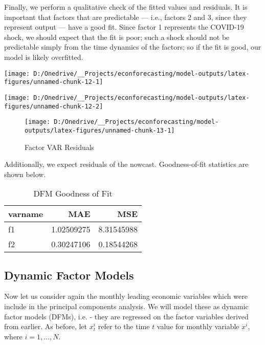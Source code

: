 \documentclass[11pt, letterpaper]{article}\usepackage[]{graphicx}\usepackage[]{color}
\begin{document}
Finally, we perform a qualitative check of the fitted values and residuals. It is important that factors that are predictable --- i.e., factors 2 and 3, since they represent output --- have a good fit. Since factor 1 represents the COVID-19 shock, we should expect that the fit is poor; such a shock should not be predictable simply from the time dynamics of the factors; so if the fit is good, our model is likely overfitted.


{\centering \texttt{[image: D:/Onedrive/\_\_Projects/econforecasting/model-outputs/latex-figures/unnamed-chunk-12-1]} 

}




{\centering \texttt{[image: D:/Onedrive/\_\_Projects/econforecasting/model-outputs/latex-figures/unnamed-chunk-12-2]} 

}





\begin{figure}[H]

{\centering \texttt{[image: D:/Onedrive/\_\_Projects/econforecasting/model-outputs/latex-figures/unnamed-chunk-13-1]} 

}

\caption[Factor VAR Residuals]{Factor VAR Residuals}\label{fig:unnamed-chunk-13}
\end{figure}



Additionally, we expect residuals of the nowcast. Goodness-of-fit statistics are shown below.
\begin{table}[H]
\centering
\begingroup\footnotesize
\begin{tabular}{lrr}
  \hline
varname & MAE & MSE \\ 
  \hline
f1 & 1.02509275 & 8.31545988 \\ 
  f2 & 0.30247106 & 0.18544268 \\ 
   \hline
\end{tabular}
\endgroup
\caption{DFM Goodness of Fit} 
\end{table}




\subsection{Dynamic Factor Models}
Now let us consider again the monthly leading economic variables which were include in the principal components analysis. We will model these as dynamic factor models (DFMs), i.e. - they are regressed on the factor variables derived from earlier. As before, let $x^i_t$ refer to the time $t$ value for monthly variable $x^i$, where $i = 1, \dots, N$.
\end{document}
